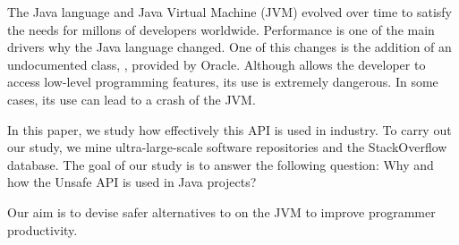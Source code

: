 
The Java language and Java Virtual Machine (JVM) evolved over time to satisfy the needs for millons of developers worldwide.
Performance is one of the main drivers why the Java language changed.
One of this changes is the addition of an undocumented class, \smu{}, provided by Oracle.
Although \smu{} allows the developer to access low-level programming features, its use is extremely dangerous.
In some cases, its use can lead to a crash of the JVM.

In this paper, we study how effectively this API is used in industry.
To carry out our study, we mine ultra-large-scale software repositories and the StackOverflow database.
The goal of our study is to answer the following question: Why and how the Unsafe API is used in Java projects?

Our aim is to devise safer alternatives to \smu{} on the JVM to improve programmer productivity.
